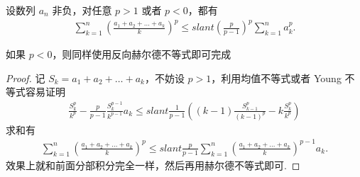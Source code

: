 \documentclass[../../main.tex]{subfiles}
\begin{document}
\begin{corollary}[离散版Hardy不等式]\label{corollary:离散版Hardy(哈代)不等式}
设数列 $a_n$ 非负，对任意 $p > 1$ 或者 $p < 0$，都有
\begin{align*}
\sum_{k=1}^n \left( \frac{a_1 + a_2 + \dots + a_k}{k} \right)^p \leqslant slant \left( \frac{p}{p - 1} \right)^p \sum_{k=1}^n a_k^p.
\end{align*}
\end{corollary}
\begin{remark}
如果 $p < 0$，则同样使用反向赫尔德不等式即可完成
\end{remark}
\begin{proof}
记 $S_k = a_1 + a_2 + \dots + a_k$，不妨设 $p > 1$，利用均值不等式或者 Young 不等式容易证明
\begin{align*}
\frac{S_k^p}{k^p} - \frac{p}{p - 1} \frac{S_k^{p - 1}}{k^{p - 1}} a_k \leqslant slant \frac{1}{p - 1} \left( (k - 1) \frac{S_{k - 1}^p}{(k - 1)^p} - k \frac{S_k^p}{k^p} \right)
\end{align*}
求和有
\begin{align*}
\sum_{k=1}^n \left( \frac{a_1 + a_2 + \dots + a_k}{k} \right)^p \leqslant slant \frac{p}{p - 1} \sum_{k=1}^n \left( \frac{a_1 + a_2 + \dots + a_k}{k} \right)^{p - 1} a_k.
\end{align*}
效果上就和前面分部积分完全一样，然后再用赫尔德不等式即可.
\end{proof}
\end{document}

